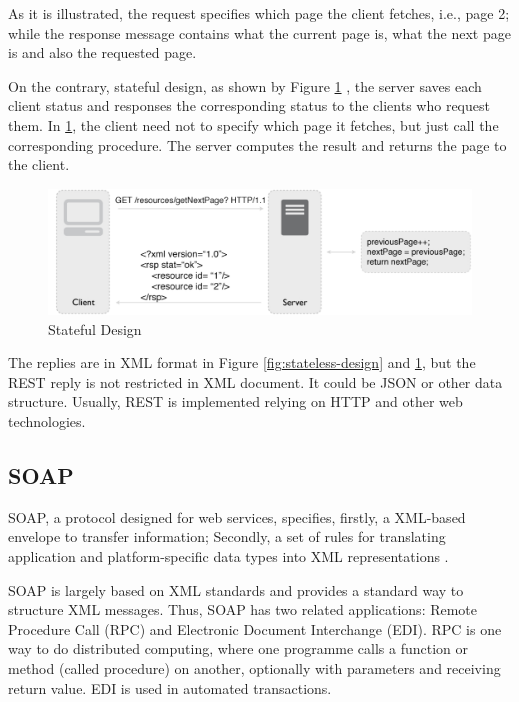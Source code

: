 As it is illustrated, the request specifies which page the client fetches, i.e., page 2; while the response message contains what the current page is, what the next page is and also the requested page.

On the contrary, stateful design, as shown by Figure \ref{fig:stateful-design} \cite{rodriguez2008restful}, the server saves each client status and responses the corresponding status to the clients who request them. In \ref{fig:stateful-design}, the client need not to specify which page it fetches, but just call the corresponding procedure. The server computes the result and returns the page to the client.

\begin{figure}[ht]
  \begin{center}
    \includegraphics[width=1\textwidth]{images/stateful-design.pdf}
    \caption{Stateful Design}
    \label{fig:stateful-design}
  \end{center}
\end{figure}

The replies are in XML format in Figure \ref{fig:stateless-design} and \ref{fig:stateful-design}, but the REST reply is not restricted in XML document. It could be JSON or other data structure. Usually, REST is implemented relying on HTTP and other web technologies. 

\subsection{SOAP}
SOAP, a protocol designed for web services, specifies, firstly, a XML-based envelope to transfer information; Secondly, a set of rules for translating application and platform-specific data types into XML representations \cite{snell2009programming}. 

SOAP is largely based on XML standards and provides a standard way to structure XML messages. Thus, SOAP has two related applications: Remote Procedure Call (RPC) and Electronic Document Interchange (EDI). RPC is one way to do distributed computing, where one programme calls a function or method (called procedure) on another, optionally with parameters and receiving return value. EDI is used in automated transactions.


